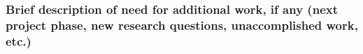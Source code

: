 \documentclass[letterpaper,12pt]{article}
\begin{document}
\subsubsection*{Brief description of need for additional work, if any (next project phase, new research questions, unaccomplished work, etc.)}













\end{document}
